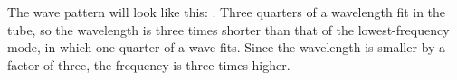 The wave pattern will look like this: .
Three quarters of a wavelength fit in the tube, so the
wavelength is three times shorter than that of the lowest-frequency
mode, in which one quarter of a wave fits. Since the wavelength is
smaller by a factor of three, the frequency is three times higher.



